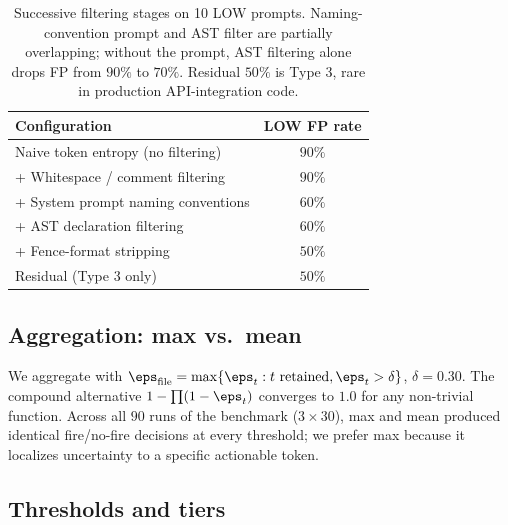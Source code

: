 \begin{table}[h]
\centering
\small
\begin{tabular}{lc}
\toprule
\textbf{Configuration} & \textbf{LOW FP rate} \\
\midrule
Naive token entropy (no filtering)                & $90\%$ \\
+ Whitespace / comment filtering                   & $90\%$ \\
+ System prompt naming conventions                 & $60\%$ \\
+ AST declaration filtering                        & $60\%$ \\
+ Fence-format stripping                           & $50\%$ \\
\midrule
Residual (Type 3 only)                             & $50\%$ \\
\bottomrule
\end{tabular}
\caption{Successive filtering stages on 10 LOW prompts. Naming-%
convention prompt and AST filter are partially overlapping; without
the prompt, AST filtering alone drops FP from $90\%$ to $70\%$.
Residual $50\%$ is Type 3, rare in production API-integration code.}
\label{tab:filtering}
\end{table}

\subsection{Aggregation: max vs.\ mean}
\label{subsec:aggregation}

We aggregate with
$\eps_\text{file} = \max\{\eps_t : t \text{ retained}, \eps_t > \delta\}$,
$\delta = 0.30$. The compound alternative
$1 - \prod(1 - \eps_t)$ converges to $1.0$ for any non-trivial function.
Across all $90$ runs of the benchmark ($3 \times 30$), max and mean
produced identical fire/no-fire decisions at every threshold; we prefer
max because it localizes uncertainty to a specific actionable token.

\subsection{Thresholds and tiers}
\label{subsec:tiers}

